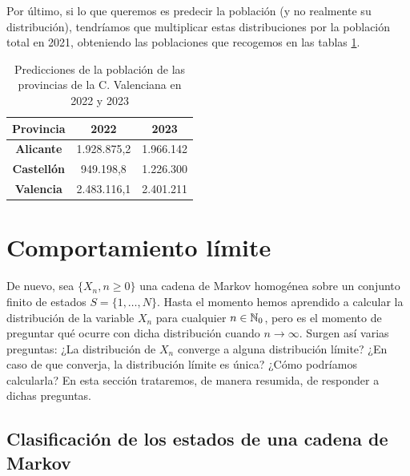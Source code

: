 \begin{ejemplo}
        Por último, si lo que queremos es predecir la población (y no realmente su distribución), tendríamos que multiplicar estas distribuciones por la población total en 2021, obteniendo las poblaciones que recogemos en las tablas \ref{tab:predicciones}.

        \begin{table}[h]
            \centering
            \begin{tabular}{ccc}\hline
            \textbf{Provincia}          & \textbf{2022} & \textbf{2023} \\ \hline\hline
            \textbf{Alicante}   & 1.928.875,2   & 1.966.142     \\ \hline
            \textbf{Castellón} & 949.198,8     & 1.226.300     \\ \hline
            \textbf{Valencia}  & 2.483.116,1   & 2.401.211    \\ \hline
            \end{tabular}
            \caption{Predicciones de la población de las provincias de la C. Valenciana en 2022 y 2023}
            \label{tab:predicciones}
            \end{table}

        
\end{ejemplo}

\section{Comportamiento límite}

De nuevo, sea $\{X_n, n\geq 0\}$ una cadena de Markov homogénea sobre un conjunto finito de estados $S=\{1,\dots,N\}$. Hasta el momento hemos aprendido a calcular la distribución de la variable $X_n$ para cualquier $n\in\mathbb{N}_0$, pero es el momento de preguntar qué ocurre con dicha distribución cuando $n\rightarrow\infty$. Surgen así varias preguntas: ¿La distribución de $X_n$ converge a alguna distribución límite? ¿En caso de que converja, la distribución límite es única? ¿Cómo podríamos calcularla? En esta sección trataremos, de manera resumida, de responder a dichas preguntas.

\subsection{Clasificación de los estados de una cadena de Markov}

